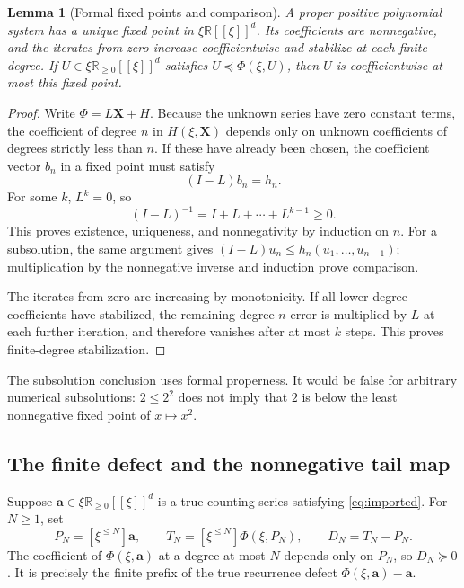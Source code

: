 \documentclass[11pt,a4paper]{article}
\newtheorem{lemma}[theorem]{Lemma}
\theoremstyle{definition}
\theoremstyle{remark}
\newcommand{\R}{\mathbb R}
\newcommand{\bA}{\boldsymbol a}
\newcommand{\bX}{\boldsymbol X}
\newcommand{\trunc}[2]{[\xi^{\leq #1}]#2}
\begin{document}
\begin{lemma}[Formal fixed points and comparison]\label{lem:formal}
A proper positive polynomial system has a unique fixed point in
$\xi\R[[\xi]]^d$. Its coefficients are nonnegative, and the iterates from
zero increase coefficientwise and stabilize at each finite degree.
If $U\in\xi\R_{\geq0}[[\xi]]^d$ satisfies
$U\preceq\Phi(\xi,U)$, then $U$ is coefficientwise at most this fixed point.
\end{lemma}
\begin{proof}
Write $\Phi=L\bX+H$. Because the unknown series have zero constant terms,
the coefficient of degree $n$ in $H(\xi,\bX)$ depends only on unknown
coefficients of degrees strictly less than $n$. If these have already been
chosen, the coefficient vector $b_n$ in a fixed point must satisfy
\[
 (I-L)b_n=h_n.
\]
For some $k$, $L^k=0$, so
\[
 (I-L)^{-1}=I+L+\cdots+L^{k-1}\geq0.
\]
This proves existence, uniqueness, and nonnegativity by induction on $n$.
For a subsolution, the same argument gives
$(I-L)u_n\leq h_n(u_1,\ldots,u_{n-1})$; multiplication by the nonnegative
inverse and induction prove comparison.

The iterates from zero are increasing by monotonicity. If all lower-degree
coefficients have stabilized, the remaining degree-$n$ error is multiplied
by $L$ at each further iteration, and therefore vanishes after at most $k$
steps. This proves finite-degree stabilization.
\end{proof}

The subsolution conclusion uses formal properness. It would be false for
arbitrary numerical subsolutions: $2\leq2^2$ does not imply that $2$ is below
the least nonnegative fixed point of $x\mapsto x^2$.

\subsection{The finite defect and the nonnegative tail map}
Suppose $\bA\in\xi\R_{\geq0}[[\xi]]^d$ is a true counting series satisfying
\eqref{eq:imported}. For $N\geq1$, set
\begin{equation}\label{eq:prefix-def}
 P_N=\trunc{N}{\bA},\qquad
 T_N=\trunc{N}{\Phi(\xi,P_N)},\qquad
 D_N=T_N-P_N.
\end{equation}
The coefficient of $\Phi(\xi,\bA)$ at a degree at most $N$ depends only on
$P_N$, so $D_N\succeq0$. It is precisely the finite prefix of the true
recurrence defect $\Phi(\xi,\bA)-\bA$.
\end{document}
